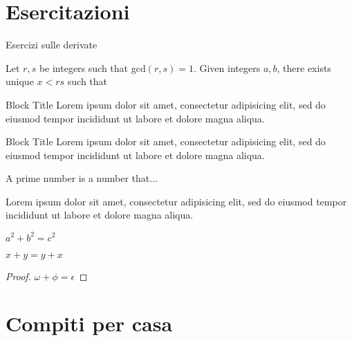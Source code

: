 \documentclass[aspectratio=169]{beamer}
\begin{document}
\section{Esercitazioni}
\begin{frame}[t]{Esercizi sulle derivate}
	\begin{theorem}
         Let $r, s$ be integers such that gcd$(r, s)=1$. 
        Given integers $a,b$, there exists unique 
        $x <rs$ such that 	
	\end{theorem}
\vspace{5pt}
        
\begin{block}{Block Title}
Lorem ipsum dolor sit amet, consectetur adipisicing elit, 
sed do eiusmod tempor incididunt ut labore et 
dolore magna aliqua.
\end{block}
\end{frame}

\begin{frame}
\begin{alertblock}{Block Title}
Lorem ipsum dolor sit amet, consectetur adipisicing elit, 
sed do eiusmod tempor incididunt ut labore et 
dolore magna aliqua.
\end{alertblock}

\begin{definition}
A prime number is a number that...
\end{definition}

\begin{example}
Lorem ipsum dolor sit amet, consectetur adipisicing elit, 
sed do eiusmod tempor incididunt ut labore et
dolore magna aliqua.
\end{example}
\end{frame}

\begin{frame}
\begin{theorem}[Pythagoras] 
$ a^2 + b^2 = c^2$
\end{theorem}

\begin{corollary}
$ x + y = y + x  $
\end{corollary}
\begin{proof}
$\omega +\phi = \epsilon $
\end{proof}
\end{frame}

\section{Compiti per casa}
\end{document}
